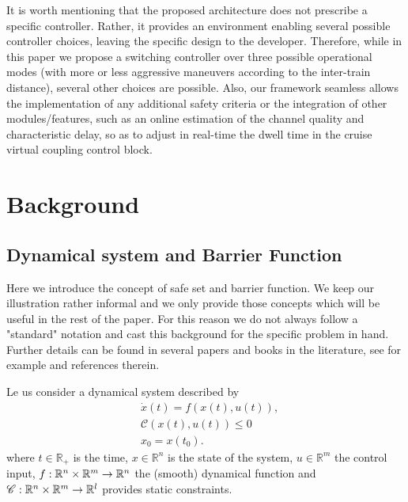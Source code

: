 \documentclass[letterpaper, 10 pt, conference]{ieeeconf}
\theoremstyle{definition}
\theoremstyle{nopoint}
\begin{document}
It is worth mentioning that the proposed architecture does not prescribe a specific controller. Rather, it provides an environment enabling several possible controller choices, leaving the specific design to the developer. 
Therefore, while in this paper we propose a switching controller over three possible operational modes (with more or less aggressive maneuvers according to the inter-train distance), several other choices are possible. 
Also, our framework seamless allows the implementation of any additional safety criteria or the integration of other modules/features, such as an online estimation of the channel quality and characteristic delay, so as to adjust in real-time the dwell time in the cruise virtual coupling control block. 






\section{Background}
 \label{sec:Background}
 





\subsection{Dynamical system and Barrier Function}
\label{subsec:barrier}

Here we introduce the concept of safe set and barrier function. We keep our illustration rather informal and we only provide those concepts which will be useful in the rest of the paper. For this reason we do not always follow a "standard" notation and cast this background for the specific problem in hand.  Further details can be found in several papers and books in the literature, see for example \cite{belta} and references therein. 


Le us consider a dynamical system described by 
\begin{subequations}\label{eq:dynamical_system}
\begin{align}
	& \dot{x}(t) = f(x(t), u(t)), \label{eq:dynamics}\\
	& \mathcal{C}(x(t),u(t))\leq 0 \label{eq:constraints}\\
	& x_0=x(t_0). \label{eq:initial_condition}
\end{align}
\end{subequations}
where $t \in \mathbb{R}_+
$ is the time, \(x \in \mathbb{R}^n\) is the state of the system, \(u \in \mathbb{R}^m\) the control input, $f: \Bbb{R}^n \times\Bbb{R}^m \rightarrow \Bbb{R}^n $ the (smooth) dynamical function and $\mathcal{C}: \Bbb{R}^n \times\Bbb{R}^m \rightarrow \Bbb{R}^l$ provides static constraints. 
\end{document}
